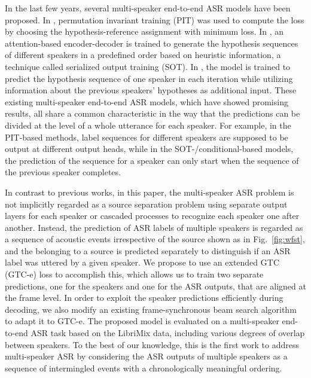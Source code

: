 \documentclass{article}
\begin{document}
In the last few years, several multi-speaker end-to-end ASR models have been proposed. In \cite{Seki2018ACL07,chang2019end}, permutation invariant training (PIT) \cite{Hershey2016ICASSP03,Isik2016Interspeech09,yu2017permutation} was used to compute the loss by choosing the hypothesis-reference assignment with minimum loss. In \cite{kanda2020serialized}, an attention-based encoder-decoder is trained to generate the hypothesis sequences of different speakers in a predefined order based on heuristic information, a technique called serialized output training (SOT). In \cite{shi2020sequence,guo2021multi}, the model is trained to predict the hypothesis sequence of one speaker in each iteration while utilizing information about the previous speakers' hypotheses as additional input.
These existing multi-speaker end-to-end ASR models, which have showed promising results, all share a common characteristic in the way that the predictions can be divided at the level of a whole utterance for each speaker. For example, in the PIT-based methods, label sequences for different speakers are supposed to be output at different output heads, while in the SOT-/conditional-based models, the prediction of the sequence for a speaker can only start when the sequence of the previous speaker completes.

In contrast to previous works, in this paper, the multi-speaker ASR problem is not implicitly regarded as a source separation problem using separate output layers for each speaker or cascaded processes to recognize each speaker one after another. Instead, the prediction of ASR labels of multiple speakers is regarded as a sequence of acoustic events irrespective of the source shown as in Fig.~\ref{fig:wfst}, and the belonging to a source is predicted separately to distinguish if an ASR label was uttered by a given speaker.
We propose to use an extended GTC (GTC-e) loss to accomplish this, which allows us to train two separate predictions, one for the speakers and one for the ASR outputs, that are aligned at the frame level.
In order to exploit the speaker predictions efficiently during decoding, we also modify an existing frame-synchronous beam search algorithm to adapt it to GTC-e.
The proposed model is evaluated on a multi-speaker end-to-end ASR task based on the LibriMix data, including various degrees of overlap between speakers.
To the best of our knowledge, this is the first work to address multi-speaker ASR 
by considering the ASR outputs of multiple speakers as a sequence of intermingled events with a chronologically meaningful ordering.
\end{document}
